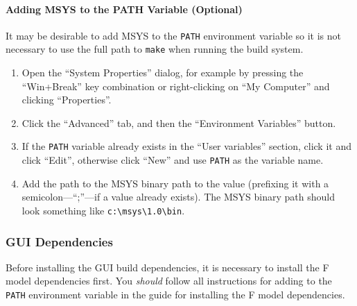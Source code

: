 \paragraph{Adding MSYS to the PATH Variable (Optional)}

It may be desirable to add MSYS to the \verb|PATH| environment variable so it is not necessary to 
use the full path to \verb|make| when running the build system.

\begin{enumerate}

\item Open the ``System Properties'' dialog, for example by pressing the ``Win+Break'' key 
combination or right-clicking on ``My Computer'' and clicking ``Properties''.

\item Click the ``Advanced'' tab, and then the ``Environment Variables'' button.

\item If the \verb|PATH| variable already exists in the ``User variables'' section, click it and 
click ``Edit'', otherwise click ``New'' and use \verb|PATH| as the variable name.

\item Add the path to the MSYS binary path to the value (prefixing it with a semicolon---``;''---if 
a value already exists).  The MSYS binary path should look something like \verb|c:\msys\1.0\bin|.

\end{enumerate}


\subsubsection{GUI Dependencies}

Before installing the GUI build dependencies, it is necessary to install the F model dependencies 
first.  You \emph{should} follow all instructions for adding to the \verb|PATH| environment variable 
in the guide for installing the F model dependencies.

